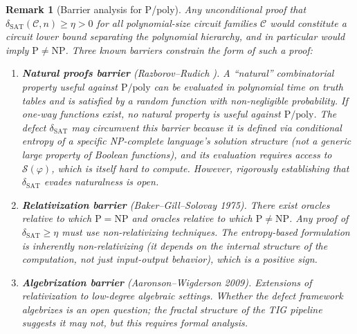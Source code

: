 \documentclass[11pt]{article}
\newtheorem{remark}[lemma]{Remark}
\theoremstyle{definition}
\begin{document}
\begin{remark}[Barrier analysis for P/poly]
\label{rem:barriers}
Any unconditional proof that $\delta_{\mathrm{SAT}}(\mathcal{C}, n) \geq \eta > 0$
for all polynomial-size circuit families $\mathcal{C}$ would constitute a circuit lower
bound separating the polynomial hierarchy, and in particular would imply $\mathrm{P} \neq \mathrm{NP}$.
Three known barriers constrain the form of such a proof:

\begin{enumerate}
  \item \textbf{Natural proofs barrier} (Razborov--Rudich \cite{RR}).
    A ``natural'' combinatorial property useful against $\mathrm{P/poly}$ can be
    evaluated in polynomial time on truth tables and is satisfied by a random function
    with non-negligible probability.  If one-way functions exist, no natural property
    is useful against $\mathrm{P/poly}$.  The defect $\delta_{\mathrm{SAT}}$ may
    circumvent this barrier because it is defined via conditional entropy of a
    \emph{specific} NP-complete language's solution structure (not a generic large
    property of Boolean functions), and its evaluation requires access to
    $\mathcal{S}(\varphi)$, which is itself hard to compute.  However, rigorously
    establishing that $\delta_{\mathrm{SAT}}$ evades naturalness is open.

  \item \textbf{Relativization barrier} (Baker--Gill--Solovay 1975).
    There exist oracles relative to which $\mathrm{P} = \mathrm{NP}$ and oracles
    relative to which $\mathrm{P} \neq \mathrm{NP}$.  Any proof of
    $\delta_{\mathrm{SAT}} \geq \eta$ must use non-relativizing techniques.
    The entropy-based formulation is inherently non-relativizing (it depends on the
    internal structure of the computation, not just input-output behavior), which is
    a positive sign.

  \item \textbf{Algebrization barrier} (Aaronson--Wigderson 2009).
    Extensions of relativization to low-degree algebraic settings.  Whether the
    defect framework algebrizes is an open question; the fractal structure of the
    TIG pipeline suggests it may not, but this requires formal analysis.
\end{enumerate}
\end{remark}
\end{document}
